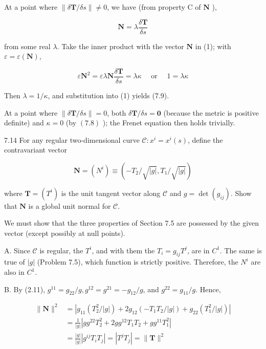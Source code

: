 \documentclass[10pt]{article}
\begin{document}
At a point where $\|\delta \mathbf{T} / \delta s\| \neq 0$, we have (from property $\mathrm{C}$ of $\mathbf{N}$ ),


\begin{equation*}
\mathbf{N}=\lambda \frac{\delta \mathbf{T}}{\delta s} \tag{1}
\end{equation*}


from some real $\lambda$. Take the inner product with the vector $\mathbf{N}$ in (1); with $\varepsilon=\varepsilon(\mathbf{N})$,


\begin{equation*}
\varepsilon \mathbf{N}^{2}=\varepsilon \lambda \mathbf{N} \frac{\delta \mathbf{T}}{\delta s}=\lambda \kappa \quad \text { or } \quad 1=\lambda \kappa \tag{2}
\end{equation*}


Then $\lambda=1 / \kappa$, and substitution into (1) yields (7.9).

At a point where $\|\delta \mathbf{T} / \delta s\|=0$, both $\delta \mathbf{T} / \delta s=\mathbf{0}$ (because the metric is positive definite) and $\kappa=0$ (by $(7.8)$ ); the Frenet equation then holds trivially.

7.14 For any regular two-dimensional curve $\mathscr{C}: x^{i}=x^{i}(s)$, define the contravariant vector


\begin{equation*}
\mathbf{N}=\left(N^{i}\right) \equiv\left(-T_{2} / \sqrt{|g|}, T_{1} / \sqrt{|g|}\right) \tag{7.16}
\end{equation*}


where $\mathbf{T}=\left(T^{i}\right)$ is the unit tangent vector along $\mathscr{C}$ and $g=\operatorname{det}\left(g_{i j}\right)$. Show that $\mathbf{N}$ is a global unit normal for $\mathscr{C}$.

We must show that the three properties of Section 7.5 are possessed by the given vector (except possibly at null points).

A. Since $\mathscr{C}$ is regular, the $T^{i}$, and with them the $T_{i}=g_{i j} T^{j}$, are in $C^{1}$. The same is true of $|g|$ (Problem 7.5), which function is strictly positive. Therefore, the $N^{i}$ are also in $C^{1}$.

B. By (2.11), $g^{11}=g_{22} / g, g^{12}=g^{21}=-g_{12} / g$, and $g^{22}=g_{11} / g$. Hence,

$$
\begin{aligned}
\|\mathbf{N}\|^{2} & =\left|g_{11}\left(T_{2}^{2} /|g|\right)+2 g_{12}\left(-T_{1} T_{2} /|g|\right)+g_{22}\left(T_{1}^{2} /|g|\right)\right| \\
& =\frac{1}{|g|}\left|g g^{22} T_{2}^{2}+2 g g^{12} T_{1} T_{2}+g g^{11} T_{1}^{2}\right| \\
& =\frac{|g|}{|g|}\left|g^{i j} T_{i} T_{j}\right|=\left|T^{j} T_{j}\right|=\|\mathbf{T}\|^{2}
\end{aligned}
$$
\end{document}
